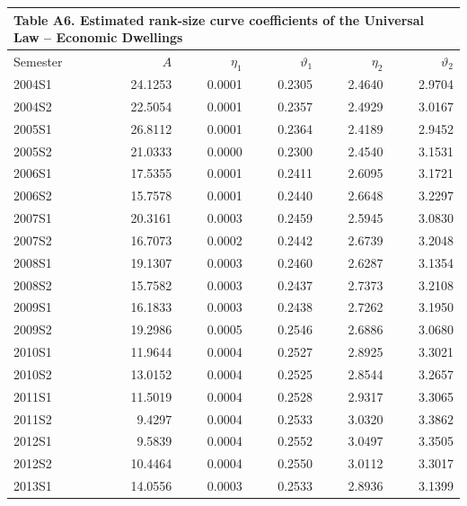 \clearpage
\begin{landscape}
\begin{table}[!ht]
  \centering
  \footnotesize
  \setlength{\tabcolsep}{4pt}
  \renewcommand{\arraystretch}{0.80}
  \begin{tabular}{lrrrrr}
    \multicolumn{6}{l}{\small\textbf{Table A6. Estimated rank-size curve coefficients of the Universal Law -- Economic Dwellings}} \\[3pt]
    \hline
    Semester & $A$ & $\eta_{1}$ & $\vartheta_{1}$ & $\eta_{2}$ & $\vartheta_{2}$ \\
    \hline
    2004S1 & 24.1253 & 0.0001 & 0.2305 & 2.4640 & 2.9704 \\
    2004S2 & 22.5054 & 0.0001 & 0.2357 & 2.4929 & 3.0167 \\
    2005S1 & 26.8112 & 0.0001 & 0.2364 & 2.4189 & 2.9452 \\
    2005S2 & 21.0333 & 0.0000 & 0.2300 & 2.4540 & 3.1531 \\
    2006S1 & 17.5355 & 0.0001 & 0.2411 & 2.6095 & 3.1721 \\
    2006S2 & 15.7578 & 0.0001 & 0.2440 & 2.6648 & 3.2297 \\
    2007S1 & 20.3161 & 0.0003 & 0.2459 & 2.5945 & 3.0830 \\
    2007S2 & 16.7073 & 0.0002 & 0.2442 & 2.6739 & 3.2048 \\
    2008S1 & 19.1307 & 0.0003 & 0.2460 & 2.6287 & 3.1354 \\
    2008S2 & 15.7582 & 0.0003 & 0.2437 & 2.7373 & 3.2108 \\
    2009S1 & 16.1833 & 0.0003 & 0.2438 & 2.7262 & 3.1950 \\
    2009S2 & 19.2986 & 0.0005 & 0.2546 & 2.6886 & 3.0680 \\
    2010S1 & 11.9644 & 0.0004 & 0.2527 & 2.8925 & 3.3021 \\
    2010S2 & 13.0152 & 0.0004 & 0.2525 & 2.8544 & 3.2657 \\
    2011S1 & 11.5019 & 0.0004 & 0.2528 & 2.9317 & 3.3065 \\
    2011S2 &  9.4297 & 0.0004 & 0.2533 & 3.0320 & 3.3862 \\
    2012S1 &  9.5839 & 0.0004 & 0.2552 & 3.0497 & 3.3505 \\
    2012S2 & 10.4464 & 0.0004 & 0.2550 & 3.0112 & 3.3017 \\
    2013S1 & 14.0556 & 0.0003 & 0.2533 & 2.8936 & 3.1399 \\

\end{tabular}
\end{table}
\end{landscape}
